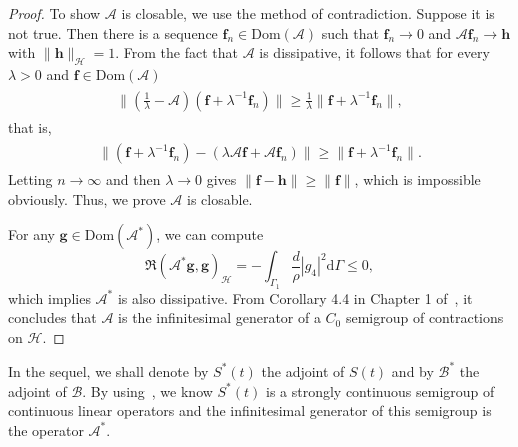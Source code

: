 \documentclass[10pt]{elsarticle}
\begin{document}
\begin{proof}
To show $\mathcal{A}$ is closable, we use the method of contradiction. Suppose it is not true. Then there is a sequence $\mathbf{f}_n\in\mathrm{Dom}(\mathcal{A})$ such that $\mathbf{f}_n\rightarrow 0$ and $\mathcal{A}\mathbf{f}_n\rightarrow \mathbf{h}$ with $\|\mathbf{h}\|_\mathcal{H}=1$. From the fact that $\mathcal{A}$ is dissipative, it follows that for every $\lambda>0$ and $\mathbf{f}\in \mathrm{Dom}(\mathcal{A})$
 \begin{eqnarray*}
\begin{aligned}
	\|(\frac{1}{\lambda}-\mathcal{A})(\mathbf{f}+\lambda^{-1}\mathbf{f}_n)\|\geq \frac{1}{\lambda}\|\mathbf{f}+\lambda^{-1}\mathbf{f}_n\|,
\end{aligned}
\end{eqnarray*}
that is,
 \begin{eqnarray*}
\begin{aligned}
	\|(\mathbf{f}+\lambda^{-1}\mathbf{f}_n)-(\lambda \mathcal{A}\mathbf{f}+ \mathcal{A}\mathbf{f}_n)\|\geq\|\mathbf{f}+\lambda^{-1}\mathbf{f}_n\|.
\end{aligned}
\end{eqnarray*}
Letting $n\rightarrow\infty$ and then $\lambda\rightarrow 0$ gives $\|\mathbf{f}-\mathbf{h}\|\geq\|\mathbf{f}\|$, which is impossible obviously. Thus, we prove $\mathcal{A}$ is closable. 

For any $\mathbf{g}\in\mathrm{Dom}(\mathcal{A}^{\ast})$, we can compute
\[
\Re(\mathcal{A}^{\ast}\mathbf{g}, \mathbf{g})_{\mathcal{H}} = - \int_{\Gamma_{1}}\frac{d}{\rho}|g_4 |^2 \mathrm{d}\Gamma \leqslant 0,
\] 
which implies $\mathcal{A}^{\ast}$ is also dissipative.
From Corollary 4.4 in Chapter 1 of~\cite{Pazy}, it concludes that $\mathcal{A}$ is the infinitesimal generator of a $C_0$ semigroup of contractions on $\mathcal{H}$.
\end{proof}

In the sequel, we shall denote by $S^{\ast}(t)$ the adjoint of $S(t)$ and by $\mathcal{B}^{\ast}$ the adjoint of $\mathcal{B}$. By using~\cite[Corollary 10.6, pp. 41]{Pazy}, we know $S^{\ast}(t)$ is a strongly continuous semigroup of continuous linear operators and the infinitesimal generator of this semigroup is the operator $\mathcal{A}^\ast$.
\end{document}
